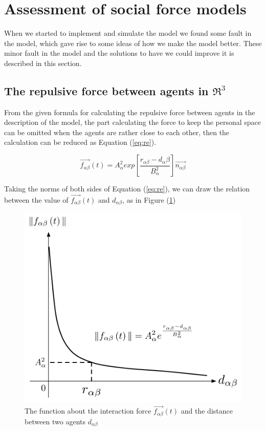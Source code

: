 \section{Assessment of social force models}
\label{sec:assessment}
When we started to implement and simulate the model we found some fault
in the model, which gave rise to some ideas of how we make the model better.
These minor fault in the model and the solutions to have we could improve it
is described in this section.

\subsection{The repulsive force between agents in $ \Re ^{3}$}
From the given formula for calculating the repulsive force between agents in the 
description of the model, the part calculating the force to keep the personal space 
can be omitted when the agents are rather close to each other, then the calculation 
can be reduced as Equation (\ref{eq:re}).

\begin{equation}\label{eq:re}
\overrightarrow{f_{\alpha\beta}}(t) = A_{\alpha}^{2} exp\left[ \frac{r_{\alpha\beta} - d_{\alpha}\beta}{B_{\alpha}^{2}}\right]  \overrightarrow{n_{\alpha\beta}}
\end{equation}

Taking the norms of both sides of Equation (\ref{eq:re}), we can draw the relation 
between the value of $\overrightarrow{f_{\alpha\beta}}(t)$ and $d_{\alpha \beta}$, 
as in Figure (\ref{fig:physicalinteraction})
\\
\begin{figure}
\centering
\includegraphics[scale=0.45]{Figures/physicalinteraction.pdf} 
\caption{The function about the interaction force $\vec{f_{\alpha\beta}}(t)$ and the distance between two agents
$d_{\alpha\beta}$ }\label{fig:physicalinteraction}
\end{figure}

